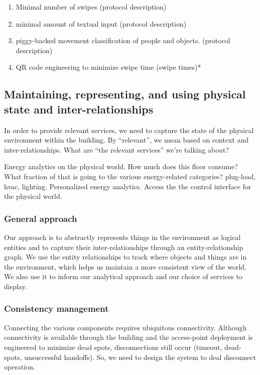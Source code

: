 \begin{enumerate}
\item Minimal number of swipes (protocol description)
\item minimal amount of textual input (protocol description)
\item piggy-backed movement classification of people and objects. (protocol description)
\item QR code engineering to minimize swipe time (swipe times)*
\end{enumerate}

\subsection{Maintaining, representing, and using physical state and inter-relationships}
In order to provide relevant services, we need to capture the state of the physical environment within the building.  By “relevant”, we mean based on context and inter-relationships.  What are “the relevant services” we’re talking about?

Energy analytics on the physical world.
How much does this floor consume?
What fraction of that is going to the various energy-related categories?  plug-load, hvac, lighting.
Personalized energy analytics.
Access the the control interface for the physical world.

\subsubsection{General approach}
Our approach is to abstractly represents things in the environment as logical entities and to capture their inter-relationships through an entity-relationship graph.  We use the entity relationships to track where objects and things are in the environment, which helps us maintain a more consistent view of the world.  We also use  it to inform our analytical approach and our choice of services to display.

\subsubsection{Consistency management}
Connecting the various components requires ubiquitous connectivity.  Although connectivity is available through the building and the access-point deployment is engineered to minimize dead spots, disconnections still occur (timeout, dead-spots, unsuccessful handoffs).  So, we need to design the system to deal disconnect operation.


